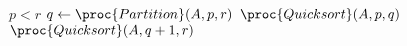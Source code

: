 \begin{codebox}
\li \If $p < r$
\li \Then
		$q \gets \proc{Partition}(A,p,r)$
\li 	$\proc{Quicksort}(A,p,q)$
\li 	$\proc{Quicksort}(A,q+1,r)$
	\End
\end{codebox}